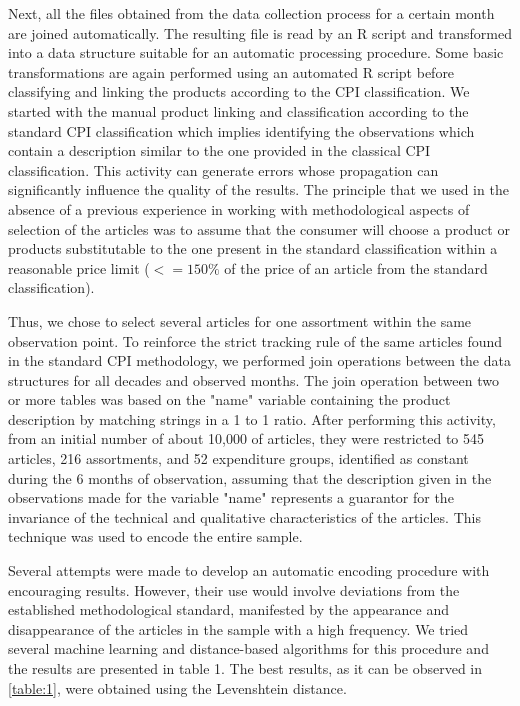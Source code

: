 \documentclass[]{article}
\begin{document}
Next, all the files obtained from the data collection process for a certain month are joined automatically. The resulting 
file is read by an R script and transformed into a data structure suitable for an automatic processing procedure. Some 
basic transformations are again performed using an automated R script before classifying and linking the products according 
to the CPI classification. We started with the manual product linking and classification according to the standard CPI 
classification which implies identifying the observations which contain a description similar to the one provided in the
classical CPI classification. This activity can generate errors whose propagation can significantly influence the quality 
of the results. The principle that we used in the absence of a previous experience in working with methodological aspects 
of selection of the articles was to assume that the consumer will choose a product or products substitutable to the one present 
in the standard classification within a reasonable price limit ($<= 150\%$ of the price of an article from the standard classification). 

Thus, we chose to select several articles for one assortment within the same observation point. To reinforce the strict tracking 
rule of the same articles found in the standard CPI methodology, we performed join operations between the data structures 
for all decades and observed months. The join operation between two or more tables was based on the "name" variable containing 
the product description by matching strings in a 1 to 1 ratio. After performing this activity, from an initial number 
of about 10,000 of articles, they were restricted to 545 articles, 216 assortments, and 52 expenditure groups, 
identified as constant during the 6 months of observation, assuming that the description given in the observations 
made for the variable "name" represents a guarantor for the invariance of the technical and qualitative characteristics 
of the articles. This technique was used to encode the entire sample.


Several attempts were made to develop an automatic encoding procedure with encouraging results. However, their use 
would involve deviations from the established methodological standard, manifested by the appearance and disappearance 
of the articles in the sample with a high frequency. We tried several machine learning and distance-based algorithms 
for this procedure and the results are presented in table 1. The best results, as it can be observed in \ref{table:1}, 
were obtained using the Levenshtein distance.
\end{document}
